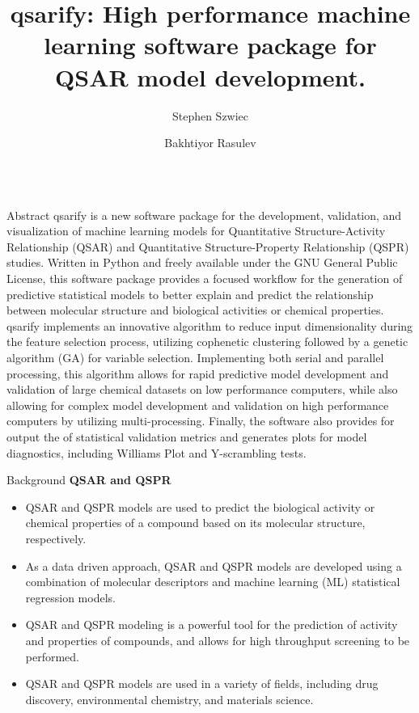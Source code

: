 \documentclass[final]{beamer}
\title{\huge qsarify: High performance machine learning software package for QSAR model development.}
\author{Stephen Szwiec \and Bakhtiyor Rasulev}
\institute[shortinst]{Department of Coatings and Polymeric Materials, North Dakota State University, Fargo, ND}
\newlength{\colwidth}
\begin{document}
	\begin{frame}[t]
		\begin{columns}[t]
			\begin{column}{\colwidth}
				\begin{block}{Abstract}
qsarify is a new software package for the development, validation, and visualization of machine learning models for Quantitative Structure-Activity Relationship (QSAR) and Quantitative Structure-Property Relationship (QSPR) studies. Written in Python and freely available under the GNU General Public License, this software package provides a focused workflow for the generation of predictive statistical models to better explain and predict the relationship between molecular structure and biological activities or chemical properties. qsarify implements an innovative algorithm to reduce input dimensionality during the feature selection process, utilizing cophenetic clustering followed by a genetic algorithm (GA) for variable selection. Implementing both serial and parallel processing, this algorithm allows for rapid predictive model development and validation of large chemical datasets on low performance computers, while also allowing for complex model development and validation on high performance computers by utilizing multi-processing. Finally, the software also provides for output the of statistical validation metrics and generates plots for model diagnostics, including Williams Plot and Y-scrambling tests.
				\end{block}

				\begin{block}{Background}
					\large{\bfseries{QSAR and QSPR}} \smallskip

					\begin{itemize}
						\item QSAR and QSPR models are used to predict the biological activity or chemical properties of a compound based on its molecular structure, respectively.
						\item As a data driven approach, QSAR and QSPR models are developed using a combination of molecular descriptors and machine learning (ML) statistical regression models.
						\item QSAR and QSPR modeling is a powerful tool for the prediction of activity and properties of compounds, and allows for high throughput screening to be performed.
						\item QSAR and QSPR models are used in a variety of fields, including drug discovery, environmental chemistry, and materials science.
					\end{itemize}


\end{block}
\end{column}
\end{columns}
\end{frame}
\end{document}
